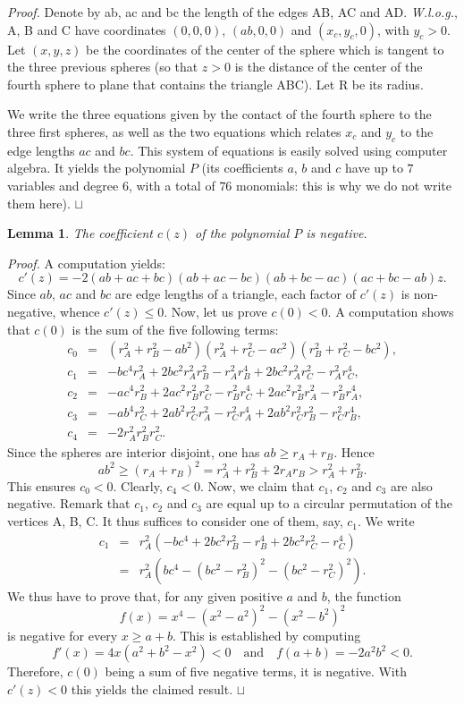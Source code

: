 \documentclass[11pt]{article}
\newtheorem{lemma}{Lemma}
\newenvironment{proof}{\noindent \emph{Proof. }}{\hfill \hbox{\rlap{$\sqcap$}$\sqcup$}\\}
\begin{document}
\begin{proof}
Denote by ab, ac and bc the length of the edges AB, AC and AD.
{\em W.l.o.g.}, A, B and C have coordinates $(0,0,0)$, $(ab,0,0)$ and $(x_c,y_c,0)$, with $y_c>0$. 
Let $(x,y,z)$ be the coordinates of the center of the sphere which is tangent to the three previous spheres (so that $z>0$ is the distance of the center of the fourth sphere to plane that contains the triangle ABC).
Let R be its radius.

We write the three equations given by the contact of the fourth sphere to the three first spheres, as well as the two equations which relates $x_c$ and $y_c$ to the edge lengths $ac$ and $bc$.
This system of equations is easily solved using computer algebra.
It yields the polynomial $P$ (its coefficients $a$, $b$ and $c$ have up to $7$ variables and degree $6$, with a total of $76$ monomials: this is why we do not write them here).
\end{proof}


\begin{lemma}
\label{lem:negative_C}
The coefficient $c(z)$ of the polynomial $P$ is negative.
\end{lemma}

\begin{proof}
A computation yields:
\[
c'(z)=-2(ab+ac+bc)(ab+ac-bc)(ab+bc-ac)(ac+bc-ab)z.
\]
Since $ab$, $ac$ and $bc$ are edge lengths of a triangle, each factor of $c'(z)$ is non-negative, whence $c'(z)\leq 0$.
Now, let us prove $c(0)<0$.
A computation shows that $c(0)$ is the sum of the five following terms:
\begin{eqnarray*}
c_0&=&(r_A^2+r_B^2-ab^2)(r_A^2+r_C^2-ac^2)(r_B^2+r_C^2-bc^2),\\
c_1&=&-bc^4r_A^2 + 2bc^2r_A^2r_B^2 - r_A^2r_B^4 + 2bc^2r_A^2r_C^2 - r_A^2r_C^4,\\
c_2&=&-ac^4r_B^2 + 2ac^2r_B^2r_C^2 - r_B^2r_C^4 + 2ac^2r_B^2r_A^2 - r_B^2r_A^4,\\
c_3&=&-ab^4r_C^2 + 2ab^2r_C^2r_A^2 - r_C^2r_A^4 + 2ab^2r_C^2r_B^2 - r_C^2r_B^4,\\
c_4&=&-2r_A^2r_B^2r_C^2.
\end{eqnarray*}
Since the spheres are interior disjoint, one has $ab\geq r_A+r_B$.
Hence
\[
ab^2\geq (r_A+r_B)^2=r_A^2+r_B^2+2r_Ar_B> r_A^2+r_B^2.
\]
This ensures $c_0<0$. 
Clearly, $c_4<0$.
Now, we claim that $c_1$, $c_2$ and $c_3$ are also negative.
Remark that $c_1$, $c_2$ and $c_3$ are equal up to a circular permutation of the vertices A, B, C.
It thus suffices to consider one of them, say, $c_1$.
We write
\begin{eqnarray*}
c_1
&=&r_A^2(-bc^4 + 2bc^2r_B^2 - r_B^4 + 2bc^2r_C^2 - r_C^4)\\
&=&r_A^2(bc^4-(bc^2-r_B^2)^2-(bc^2-r_C^2)^2).
\end{eqnarray*}
We thus have to prove that, for any given positive $a$ and $b$, the function
\[
f(x)=x^4-(x^2-a^2)^2-(x^2-b^2)^2
\]
is negative for every $x\geq a+b$.
This is established by computing
\[
f'(x)=4x(a^2+b^2-x^2)<0
\quad\textrm{and}\quad
f(a+b)=-2a^2b^2<0.
\]
Therefore, $c(0)$ being a sum of five negative terms, it is negative.
With $c'(z)<0$ this yields the claimed result.
\end{proof}
\end{document}
